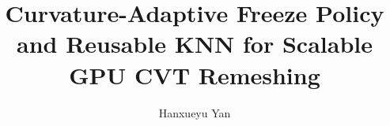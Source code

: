 \documentclass[acmsmall,screen,review]{acmart}
\begin{document}
\title{Curvature-Adaptive Freeze Policy and Reusable KNN for Scalable GPU CVT Remeshing}

\author{Hanxueyu Yan}
\affiliation{%
  \institution{}
  \city{}
  \country{}
}



\maketitle









\end{document}
